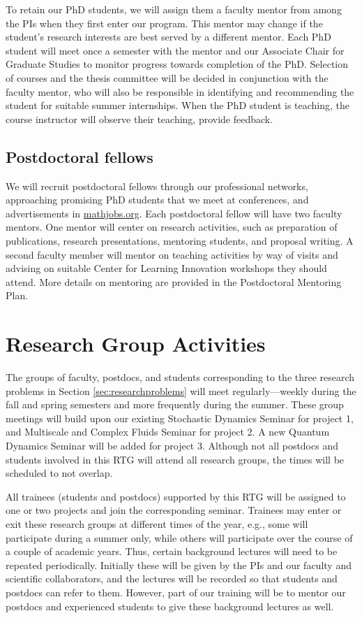 \documentclass[11pt]{NSFamsart}
\begin{document}
To retain our PhD students, we will assign them a faculty mentor from among the PIs when they first enter our program.  This mentor may change if the student's research interests are best served by a different mentor.  Each PhD student will meet once a semester with the mentor and our Associate Chair for Graduate
Studies to monitor progress towards completion of the PhD.  Selection of courses and the thesis committee
will be decided in conjunction with the faculty mentor, who will also be responsible in identifying
and recommending the student for suitable summer internships. When the PhD student is teaching, the course instructor will observe their teaching, provide feedback.

\subsection*{Postdoctoral fellows}
We will recruit postdoctoral fellows through our professional networks, approaching promising PhD students that we meet at conferences, and advertisements in \url{mathjobs.org}. Each postdoctoral fellow will have two faculty mentors. One mentor will center on research activities, such as preparation of 
publications, research presentations, mentoring students, and proposal writing. A second faculty member will mentor on teaching activities by way of visits and advising on suitable Center for Learning Innovation workshops they should attend. More details on mentoring are provided in the Postdoctoral Mentoring Plan.


\section{Research Group Activities}
The groups of faculty, postdocs, and students corresponding to the three research problems in Section \ref{sec:researchproblems} will meet regularly---weekly during the fall and spring semesters and more frequently during the summer.  These group meetings will build upon our existing Stochastic Dynamics Seminar for project 1, and Multiscale and Complex Fluids Seminar for project 2. A new Quantum Dynamics Seminar will be added for project 3.  Although not all postdocs and students involved in this RTG will attend all research groups, the times will be scheduled to not overlap. 

All trainees (students and postdocs) supported by this RTG will be assigned to one or two projects and join the corresponding seminar.  Trainees may enter or exit these research groups at different times of the year, e.g., some will participate during a summer only, while others will participate over the course of a couple of academic years. Thus, certain background lectures will need to be repeated periodically.  Initially these will be given by the PIs and our faculty and scientific collaborators, and the lectures will be recorded so that students and postdocs can refer to them.  However, part of our training will be to mentor our postdocs and experienced students to give these background lectures as well.  
\end{document}
